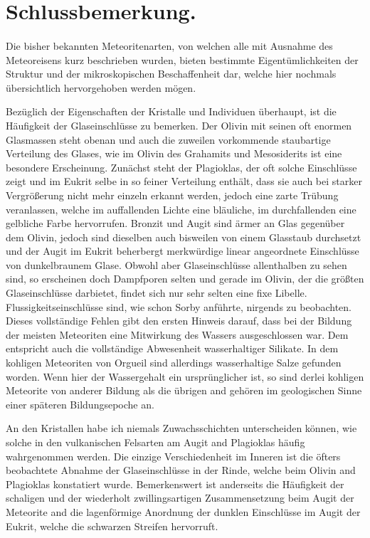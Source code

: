 \documentclass[a4paper, 11pt, oneside, polutonikogreek, german]{article}
\begin{document}
\section{Schlussbemerkung.}
\paragraph*{}
Die bisher bekannten Meteoritenarten, von welchen alle mit Ausnahme des Meteoreisens kurz beschrieben wurden, bieten bestimmte Eigentümlichkeiten der Struktur und der mikroskopischen Beschaffenheit dar, welche hier nochmals übersichtlich hervorgehoben werden mögen.

Bezüglich der Eigenschaften der Kristalle und Individuen überhaupt, ist die Häufigkeit der Glaseinschlüsse zu bemerken. Der Olivin mit seinen oft enormen Glasmassen steht obenan und auch die zuweilen vorkommende staubartige Verteilung des Glases, wie im Olivin des Grahamits und Mesosiderits ist eine besondere Erscheinung. Zunächst steht der Plagioklas, der oft solche Einschlüsse zeigt und im Eukrit selbe in so feiner Verteilung enthält, dass sie auch bei starker Vergrößerung nicht mehr einzeln erkannt werden, jedoch eine zarte Trübung veranlassen, welche im auffallenden Lichte eine bläuliche, im durchfallenden eine gelbliche Farbe hervorrufen. Bronzit und Augit sind ärmer an Glas gegenüber dem Olivin, jedoch sind dieselben auch bisweilen von einem Glasstaub durchsetzt und der Augit im Eukrit beherbergt merkwürdige linear angeordnete Einschlüsse von dunkelbraunem Glase. Obwohl aber Glaseinschlüsse allenthalben zu sehen sind, so erscheinen doch Dampfporen selten und gerade im Olivin, der die größten Glaseinschlüsse darbietet, findet sich nur sehr selten eine fixe Libelle. Flussigkeitseinschlüsse sind, wie schon Sorby anführte, nirgends zu beobachten. Dieses vollständige Fehlen gibt den ersten Hinweis darauf, dass bei der Bildung der meisten Meteoriten eine Mitwirkung des Wassers ausgeschlossen war. Dem entspricht auch die vollständige Abwesenheit wasserhaltiger Silikate. In dem kohligen Meteoriten von Orgueil sind allerdings wasserhaltige Salze gefunden worden. Wenn hier der Wassergehalt ein ursprünglicher ist, so sind derlei kohligen Meteorite von anderer Bildung als die übrigen and gehören im geologischen Sinne einer späteren Bildungsepoche an.

An den Kristallen habe ich niemals Zuwachsschichten unterscheiden können, wie solche in den vulkanischen Felsarten am Augit and Plagioklas häufig wahrgenommen werden. Die einzige Verschiedenheit im Inneren ist die öfters beobachtete Abnahme der Glaseinschlüsse in der Rinde, welche beim Olivin and Plagioklas konstatiert wurde. Bemerkenswert ist anderseits die Häufigkeit der schaligen und der wiederholt zwillingsartigen Zusammensetzung beim Augit der Meteorite and die lagenförmige Anordnung der dunklen Einschlüsse im Augit der Eukrit, welche die schwarzen Streifen hervorruft.
\end{document}
